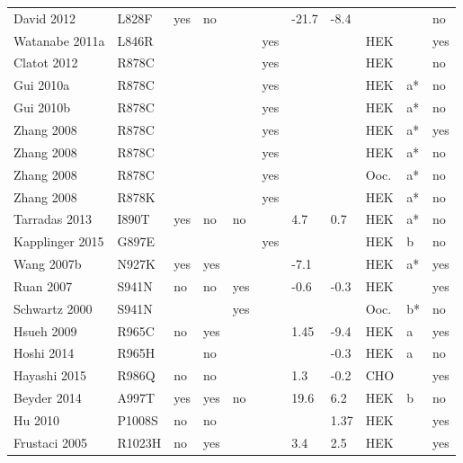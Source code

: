 \begin{tiny}
\begin{longtable}{p{4cm}|l|llll|ll|lll}
David 2012\cite{David2012MutationDB} & L828F & yes & no &  &  & -21.7 & -8.4 &  &  & no \\
Watanabe 2011a\cite{Watanabe2011aMutationDB} & L846R &  &  &  & yes &  &  & HEK &  & yes \\
Clatot 2012\cite{Clatot2012MutationDB} & R878C &  &  &  & yes &  &  & HEK &  & no \\
Gui 2010a\cite{Gui2010aMutationDB} & R878C &  &  &  & yes &  &  & HEK & a* & no \\
Gui 2010b\cite{Gui2010bMutationDB} & R878C &  &  &  & yes &  &  & HEK & a* & no \\
Zhang 2008\cite{Zhang2008MutationDB} & R878C &  &  &  & yes &  &  & HEK & a* & yes \\
Zhang 2008\cite{Zhang2008MutationDB} & R878C &  &  &  & yes &  &  & HEK & a* & no \\
Zhang 2008\cite{Zhang2008MutationDB} & R878C &  &  &  & yes &  &  & Ooc. & a* & no \\
Zhang 2008\cite{Zhang2008MutationDB} & R878K &  &  &  & yes &  &  & HEK & a* & no \\
Tarradas 2013\cite{Tarradas2013MutationDB} & I890T & yes & no & no &  & 4.7 & 0.7 & HEK & a* & no \\
Kapplinger 2015\cite{Kapplinger2015MutationDB} & G897E &  &  &  & yes &  &  & HEK & b & no \\
Wang 2007b\cite{Wang2007bMutationDB} & N927K & yes & yes &  &  & -7.1 &  & HEK & a* & yes \\
Ruan 2007\cite{Ruan2007MutationDB} & S941N & no & no & yes &  & -0.6 & -0.3 & HEK &  & yes \\
Schwartz 2000\cite{Schwartz2000MutationDB} & S941N &  &  & yes &  &  &  & Ooc. & b* & no \\
Hsueh 2009\cite{Hsueh2009MutationDB} & R965C & no & yes &  &  & 1.45 & -9.4 & HEK & a & yes \\
Hoshi 2014\cite{Hoshi2014MutationDB} & R965H &  & no &  &  &  & -0.3 & HEK & a & no \\
Hayashi 2015\cite{Hayashi2015MutationDB} & R986Q & no & no &  &  & 1.3 & -0.2 & CHO &  & yes \\
Beyder 2014\cite{Beyder2014MutationDB} & A997T & yes & yes & no &  & 19.6 & 6.2 & HEK & b & no \\
Hu 2010\cite{Hu2010MutationDB} & P1008S & no & no &  &  &  & 1.37 & HEK &  & yes \\
Frustaci 2005\cite{Frustaci2005MutationDB} & R1023H & no & yes &  &  & 3.4 & 2.5 & HEK &  & yes \\

\end{longtable}
\end{tiny}
